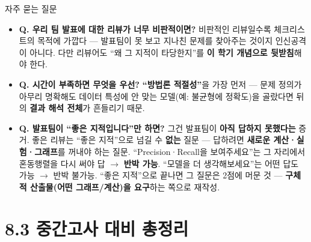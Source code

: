 \documentclass[aspectratio=169,11pt]{beamer}
\begin{document}
\begin{frame}{자주 묻는 질문}
  \begin{itemize}
    \item \textbf{Q. 우리 팀 발표에 대한 리뷰가 너무 비판적이면?}
      비판적인 리뷰일수록 체크리스트의 목적에 가깝다 ---
      발표팀이 못 보고 지나친 문제를 찾아주는 것이지 인신공격
      이 아니다. 다만 리뷰어도 ``왜 그 지적이 타당한지''를
      \textbf{이 학기 개념으로 뒷받침}해야 한다.
    \item \textbf{Q. 시간이 부족하면 무엇을 우선?}
      \textbf{``방법론 적절성''}을 가장 먼저 --- 문제 정의가
      아무리 명확해도 데이터 특성에 안 맞는 모델(예: 불균형에
      정확도)을 골랐다면 뒤의 \textbf{결과 해석 전체}가
      흔들리기 때문.
    \item \textbf{Q. 발표팀이 ``좋은 지적입니다''만 하면?}
      그건 발표팀이 \textbf{아직 답하지 못했다는} 증거. 좋은
      리뷰는 ``좋은 지적''으로 넘길 수 \textbf{없는} 질문 ---
      답하려면 \textbf{새로운 계산·실험·그래프}를 꺼내야 하는
      질문. ``Precision·Recall을 보여주세요''는 그 자리에서
      혼동행렬을 다시 써야 답 $\to$ \textbf{반박 가능}.
      ``모델을 더 생각해보세요''는 어떤 답도 가능 $\to$ 반박
      불가능. ``좋은 지적''으로 끝나면 그 질문은 2점에 머문
      것 --- \textbf{구체적 산출물(어떤 그래프/계산)을 요구}하는
      쪽으로 재작성.
  \end{itemize}
\end{frame}

\section{8.3 중간고사 대비 총정리}

\end{document}
